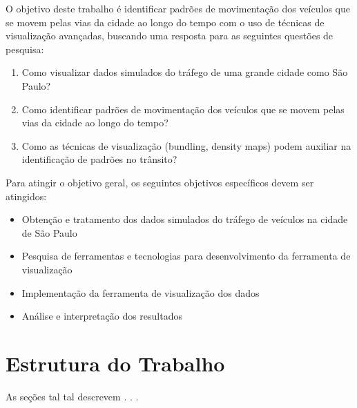 O objetivo deste trabalho é identificar padrões de movimentação dos veículos que
se movem pelas vias da cidade ao longo do tempo com o uso de técnicas
de visualização avançadas, buscando uma resposta para as seguintes
questões de pesquisa:

\begin{enumerate}
  \item Como visualizar dados simulados do tráfego de uma grande cidade como São Paulo?

  \item Como identificar padrões de movimentação dos veículos que se movem pelas vias
  da cidade ao longo do tempo?
        
  \item Como as técnicas de visualização (bundling, density maps) podem auxiliar na
    identificação de padrões no trânsito?
\end{enumerate}

Para atingir o objetivo geral, os seguintes objetivos específicos devem ser atingidos:

\begin{itemize}
  \item Obtenção e tratamento dos dados simulados do tráfego de veículos na cidade de São Paulo
  \item Pesquisa de ferramentas e tecnologias para desenvolvimento da ferramenta de visualização
  \item Implementação da ferramenta de visualização dos dados 
  \item Análise e interpretação dos resultados
\end{itemize}

\section{Estrutura do Trabalho}

As seções tal tal descrevem . . .
